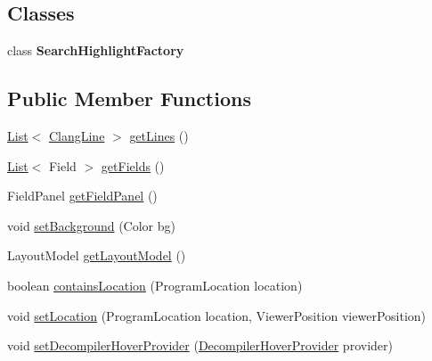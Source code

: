 \subsection*{Classes}
\begin{DoxyCompactItemize}
\item 
class {\bfseries Search\+Highlight\+Factory}
\end{DoxyCompactItemize}
\subsection*{Public Member Functions}
\begin{DoxyCompactItemize}
\item 
\mbox{\hyperlink{xml_8hh_ab5ab62f46b3735557c125f91b40ac155}{List}}$<$ \mbox{\hyperlink{classghidra_1_1app_1_1decompiler_1_1_clang_line}{Clang\+Line}} $>$ \mbox{\hyperlink{classghidra_1_1app_1_1decompiler_1_1component_1_1_decompiler_panel_ac6a17842ff6c5027d099161ea5a8a462}{get\+Lines}} ()
\item 
\mbox{\hyperlink{xml_8hh_ab5ab62f46b3735557c125f91b40ac155}{List}}$<$ Field $>$ \mbox{\hyperlink{classghidra_1_1app_1_1decompiler_1_1component_1_1_decompiler_panel_addef6024d7cd3021cc428aaf7d8fa0e1}{get\+Fields}} ()
\item 
Field\+Panel \mbox{\hyperlink{classghidra_1_1app_1_1decompiler_1_1component_1_1_decompiler_panel_aa1b8e95842468b7e57d59c1bd8a1be58}{get\+Field\+Panel}} ()
\item 
void \mbox{\hyperlink{classghidra_1_1app_1_1decompiler_1_1component_1_1_decompiler_panel_a0ed85871d15e3b2c6b9445b8736119fd}{set\+Background}} (Color bg)
\item 
Layout\+Model \mbox{\hyperlink{classghidra_1_1app_1_1decompiler_1_1component_1_1_decompiler_panel_a82fded4495c1e52154d64e6820b01c29}{get\+Layout\+Model}} ()
\item 
boolean \mbox{\hyperlink{classghidra_1_1app_1_1decompiler_1_1component_1_1_decompiler_panel_abea619d9fb63b575bc784b16575dbd5b}{contains\+Location}} (Program\+Location location)
\item 
void \mbox{\hyperlink{classghidra_1_1app_1_1decompiler_1_1component_1_1_decompiler_panel_aa7d5c96f468ed45383b4a6c1e52d57c0}{set\+Location}} (Program\+Location location, Viewer\+Position viewer\+Position)
\item 
void \mbox{\hyperlink{classghidra_1_1app_1_1decompiler_1_1component_1_1_decompiler_panel_a5ecec5f7873c2a1eeee0be24627b17b2}{set\+Decompiler\+Hover\+Provider}} (\mbox{\hyperlink{classghidra_1_1app_1_1decompiler_1_1component_1_1_decompiler_hover_provider}{Decompiler\+Hover\+Provider}} provider)

\end{DoxyCompactItemize}

